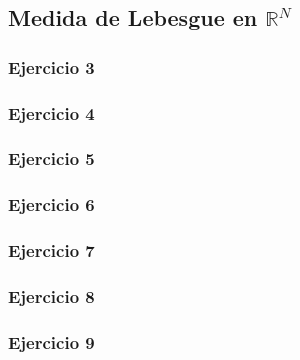 \documentclass[11pt,spanish]{article} %
\begin{document}
\subsection{Medida de Lebesgue en $\mathbb{R}^N$}
	\subsubsection{Ejercicio 3}
	
	\subsubsection{Ejercicio 4}
	
	\subsubsection{Ejercicio 5}
	
	\subsubsection{Ejercicio 6}
	
	\subsubsection{Ejercicio 7}
	
	\subsubsection{Ejercicio 8}
	
	\subsubsection{Ejercicio 9}
	
	
\end{document}
